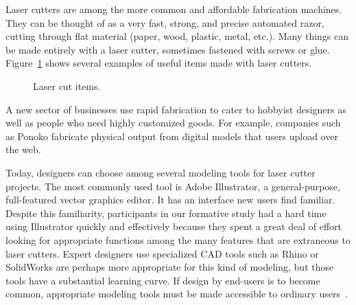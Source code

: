 \documentclass{article}
\begin{document}
Laser cutters are among the more common and affordable fabrication
machines. They can be thought of as a very fast, strong, and precise
automated razor, cutting through flat material (paper, wood, plastic,
metal, etc.). Many things can be made entirely with a laser cutter,
sometimes fastened with screws or glue.
Figure~\ref{fig:laser-example} shows several examples of useful items
made with laser cutters.

\begin{figure}[b]
\centering 
{}
\caption{Laser cut items.}
\label{fig:laser-example}
\end{figure}

A new sector of businesses use rapid fabrication to cater to hobbyist
designers as well as people who need highly customized goods. For
example, companies such as Ponoko fabricate physical output from
digital models that users upload over the web. 

Today, designers can choose among several modeling tools for laser
cutter projects. The most commonly used tool is Adobe Illustrator, a
general-purpose, full-featured vector graphics editor. It has an
interface new users find familiar. Despite this familiarity,
participants in our formative study had a hard time using Illustrator
quickly and effectively because they spent a great deal of effort
looking for appropriate functions among the many features that are
extraneous to laser cutters. Expert designers use specialized CAD
tools such as Rhino or SolidWorks are perhaps more appropriate for
this kind of modeling, but those tools have a substantial learning
curve. If design by end-users is to become common, appropriate
modeling tools must be made accessible to ordinary
users~\cite{lipson-homefactory}.
\end{document}
